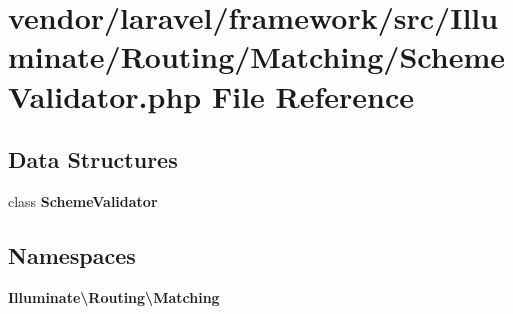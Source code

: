 \section{vendor/laravel/framework/src/\+Illuminate/\+Routing/\+Matching/\+Scheme\+Validator.php File Reference}
\label{_scheme_validator_8php}
\subsection*{Data Structures}
\begin{DoxyCompactItemize}
\item 
class {\bf Scheme\+Validator}
\end{DoxyCompactItemize}
\subsection*{Namespaces}
\begin{DoxyCompactItemize}
\item 
 {\bf Illuminate\textbackslash{}\+Routing\textbackslash{}\+Matching}
\end{DoxyCompactItemize}
